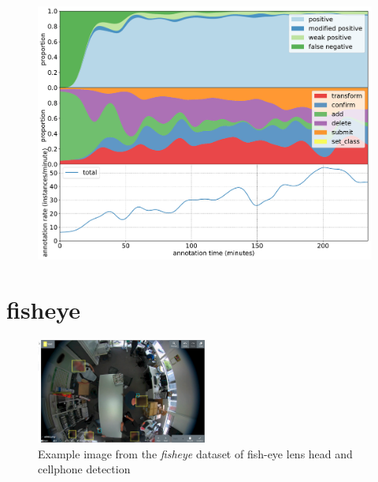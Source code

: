 \begin{figure}[!h]
\centering
\includegraphics[width=1.0\linewidth]{charts/action_annotations/buoys.pdf}
\caption{  }
\label{fig:buoys_annotation}
\end{figure}

\pagebreak
\section{fisheye}
\label{sec:fisheye_details}


\begin{figure}[H]
\begin{center}
  \includegraphics[width=0.5\textwidth]{figures/annotation/screenshots/victor.png}
\end{center}
  \caption{Example image from the \emph{fisheye} dataset of fish-eye lens head and cellphone detection }
\end{figure}

